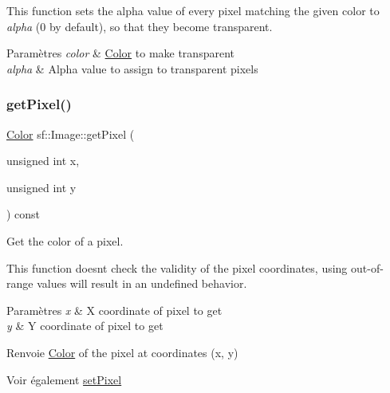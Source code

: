 This function sets the alpha value of every pixel matching the given color to {\itshape alpha} (0 by default), so that they become transparent.


\begin{DoxyParams}{Paramètres}
{\em color} & \hyperlink{classsf_1_1Color}{Color} to make transparent \\
\hline
{\em alpha} & Alpha value to assign to transparent pixels \\
\hline
\end{DoxyParams}
\mbox{\label{classsf_1_1Image_acf278760458433b2c3626a6980388a95}} 
\subsubsection{\texorpdfstring{get\+Pixel()}{getPixel()}}
{\footnotesize\ttfamily \hyperlink{classsf_1_1Color}{Color} sf\+::\+Image\+::get\+Pixel (\begin{DoxyParamCaption}\item[{unsigned int}]{x,  }\item[{unsigned int}]{y }\end{DoxyParamCaption}) const}



Get the color of a pixel. 

This function doesn\textquotesingle{}t check the validity of the pixel coordinates, using out-\/of-\/range values will result in an undefined behavior.


\begin{DoxyParams}{Paramètres}
{\em x} & X coordinate of pixel to get \\
\hline
{\em y} & Y coordinate of pixel to get\\
\hline
\end{DoxyParams}
\begin{DoxyReturn}{Renvoie}
\hyperlink{classsf_1_1Color}{Color} of the pixel at coordinates (x, y)
\end{DoxyReturn}
\begin{DoxySeeAlso}{Voir également}
\hyperlink{classsf_1_1Image_a9fd329b8cd7d4439e07fb5d3bb2d9744}{set\+Pixel} 
\end{DoxySeeAlso}
\mbox{\label{classsf_1_1Image_ad9562b126fc8d5efcf608166992865c7}} 
